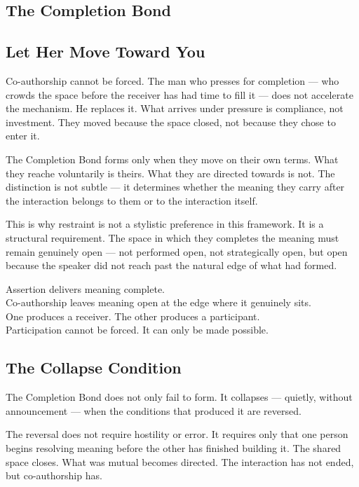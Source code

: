 
\subsection{The Completion Bond}

\subsection{Let Her Move Toward You}

Co-authorship cannot be forced. The man who presses for completion --- 
who crowds the space before the receiver has had time to fill it --- does not accelerate 
the mechanism. He replaces it. What arrives under pressure is compliance, 
not investment. They moved because the space closed, not because they chose to enter it.

The Completion Bond forms only when they move on their own terms. 
What they reache voluntarily is theirs. What they are directed towards is not. 
The distinction is not subtle --- it determines whether the meaning they 
carry after the interaction belongs to them or to the interaction itself.

This is why restraint is not a stylistic preference in this framework. 
It is a structural requirement. The space in which they completes the meaning 
must remain genuinely open --- not performed open, not strategically open, 
but open because the speaker did not reach past the natural edge of what had formed.

\begin{calloutbox}
Assertion delivers meaning complete.\\
Co-authorship leaves meaning open at the edge where it genuinely sits.\\[0.4em]
One produces a receiver. The other produces a participant.\\
Participation cannot be forced. It can only be made possible.
\end{calloutbox}

\subsection{The Collapse Condition}

The Completion Bond does not only fail to form. It collapses --- 
quietly, without announcement --- when the conditions that produced 
it are reversed.

The reversal does not require hostility or error. It requires only 
that one person begins resolving meaning before the other has finished 
building it. The shared space closes. What was mutual becomes directed. 
The interaction has not ended, but co-authorship has.

